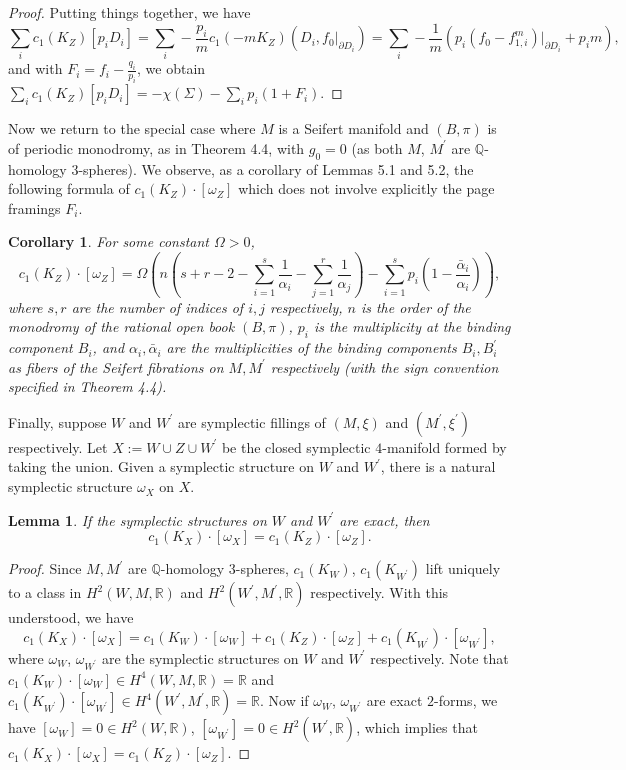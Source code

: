 \documentclass[11pt]{amsart}
\theoremstyle{plain}
\numberwithin{theorem}{section}
\newtheorem{lemma}[theorem]{Lemma}
\newtheorem{corollary}[theorem]{Corollary}
\theoremstyle{definition}
\newcommand{\R}{{\mathbb R}}
\newcommand{\Q}{{\mathbb Q}}
\begin{document}
\begin{proof}
Putting things together, we have
$$
\sum_i c_1(K_Z)[p_i D_i]=\sum_i -\frac{p_i}{m} c_1(-mK_Z)(D_i, f_0|_{\partial D_i})
=\sum_i -\frac{1}{m} (p_i(f_0-f_{1,i}^m)|_{\partial D_i}+p_im), 
$$
and with $F_i=f_i-\frac{q_i}{p_i}$, we obtain 
$\sum_i c_1(K_Z)[p_iD_i]= -\chi(\Sigma)-\sum_i p_i (1+F_i)$.

\end{proof}

Now we return to the special case where $M$ is a Seifert manifold and $(B,\pi)$ is of periodic monodromy, as in Theorem 4.4, with $g_0=0$ (as both $M$, $M^\prime$
are $\Q$-homology $3$-spheres). We observe, as a corollary of Lemmas 5.1 and 5.2,  the following formula of $c_1(K_Z)\cdot [\omega_Z]$
which does not involve explicitly the page framings $F_i$. 

\begin{corollary}
For some constant $\Omega>0$, 
$$
c_1(K_Z)\cdot [\omega_Z]=\Omega(n(s+r-2-\sum_{i=1}^s\frac{1}{\alpha_i}-\sum_{j=1}^r\frac{1}{\alpha_j})
-\sum_{i=1}^s p_i(1-\frac{\bar{\alpha}_i}{\alpha_i})),
$$
where $s,r$ are the number of indices of $i,j$ respectively, $n$ is the order of the monodromy of the
rational open book $(B,\pi)$, $p_i$ is the multiplicity at the binding component $B_i$, and $\alpha_i,
\bar{\alpha}_i$ are the multiplicities of the binding components $B_i,B_i^\prime$ as fibers of the
Seifert fibrations on $M,M^\prime$ respectively {\em(}with the sign convention specified in Theorem 4.4{\em)}. 
\end{corollary}

Finally, suppose $W$ and $W^\prime$ are symplectic fillings of $(M,\xi)$ and $(M^\prime,\xi^\prime)$
respectively. Let $X:=W\cup Z\cup W^\prime$ be the closed symplectic $4$-manifold formed by taking the union. Given a symplectic structure on $W$ and $W^\prime$, there is a natural symplectic structure $\omega_X$ on $X$.

\begin{lemma}
If the symplectic structures on $W$ and $W^\prime$ are exact, then 
$$
c_1(K_X)\cdot [\omega_X]=c_1(K_Z)\cdot [\omega_Z]. 
$$
\end{lemma}

\begin{proof}
Since $M,M^\prime$ are $\Q$-homology $3$-spheres, $c_1(K_W)$, $c_1(K_{W^\prime})$ lift
uniquely to a class in $H^2(W, M,\R)$ and $H^2(W^\prime, M^\prime,\R)$ respectively. With this
understood, we have 
$$
c_1(K_X)\cdot [\omega_X]=c_1(K_W)\cdot [\omega_W]+c_1(K_Z)\cdot [\omega_Z]+
c_1(K_{W^\prime})\cdot [\omega_{W^\prime}],
$$
where $\omega_W$, $\omega_{W^\prime}$ are the symplectic structures on $W$ and $W^\prime$
respectively. Note that $c_1(K_W)\cdot [\omega_W]\in H^4(W,M,\R)=\R$ and 
$c_1(K_{W^\prime})\cdot [\omega_{W^\prime}]\in H^4(W^\prime,M^\prime,\R)=\R$. Now if 
$\omega_W$, $\omega_{W^\prime}$ are exact $2$-forms, we have $[\omega_W]=0\in H^2(W,\R)$,
$[\omega_{W^\prime}]=0 \in H^2(W^\prime,\R)$, which implies that 
$c_1(K_X)\cdot [\omega_X]=c_1(K_Z)\cdot [\omega_Z]$.

\end{proof}
\end{document}
